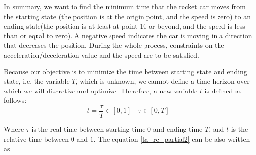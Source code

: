 	In summary, we want to find the minimum time that the rocket car moves from the starting state (the position is at the origin point, and the speed is zero) to an ending state(the position is at least at point 10 or beyond, and the speed is less than or equal to zero). A negative speed indicates the car is moving in a direction that decreases the position. During the whole process, constraints on the acceleration/deceleration value and the speed are to be satisfied. 
	
	Because our objective is to minimize the time between starting state and ending state, i.e. the variable $T$, which is unknown, we cannot define a time horizon over which we will discretize and optimize. Therefore, a new variable $t$ is defined as follows: 
	\begin{equation}
		t= \frac{\tau}{T} \in [0,1] \quad \tau \in [0, T]
		\label{eqn:timet}
	\end{equation}
	
	Where $\tau$ is the real time between starting time $0$ and ending time $T$, and $t$ is the relative time between $0$ and $1$.  The equation \ref{ta_rc_partial2} can be also written as 
	

